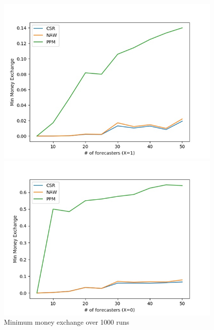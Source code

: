 \documentclass[english,10pt]{article}
\begin{document}
\begin{enumerate}
        	\begin{figure}[H]
        	\centering
        	\begin{minipage}{0.48\textwidth}
        	\includegraphics[width = \textwidth]{(Beta_1_0dot2)Min_MnEx(X=1).jpg}
        	\end{minipage}
        	\begin{minipage}{0.48\textwidth}
        	\includegraphics[width = \textwidth]{(Beta_1_0dot2)Min_MnEx(X=0).jpg}
        	\end{minipage}
        	\caption{Minimum money exchange over 1000 runs}
        	\end{figure}
	

\end{enumerate}
\end{document}

